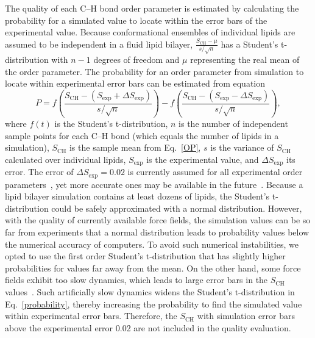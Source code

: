 \documentclass[fleqn,10pt]{wlscirep}
\begin{document}
The quality of each C--H bond order parameter is estimated by calculating the probability for a simulated value to locate within the error bars of the experimental value. Because conformational ensembles of individual lipids are assumed to be independent in a fluid lipid bilayer, $\frac{S_\mathrm{CH}-\mu}{s/\sqrt{n}}$ has a Student's t-distribution with $n-1$ degrees of freedom and $\mu$ representing the real mean of the order parameter. The probability for an order parameter from simulation to locate within experimental error bars can be estimated from equation
\begin{equation}\label{probability}
  P = f \left( \frac{S_\mathrm{CH} - (S_\mathrm{exp}+\Delta S_\mathrm{exp})}{s/\sqrt{n}} \right) - f \left( \frac{S_\mathrm{CH} - (S_\mathrm{exp}-\Delta S_\mathrm{exp})}{s/\sqrt{n}} \right),
\end{equation}
where $f(t)$ is the %
Student's t-distribution, $n$ is the number of independent sample points for each C--H bond (which equals the number of lipids in a simulation), $S_\mathrm{CH}$ is the sample mean from Eq.~\eqref{OP}, $s$ is the variance of $S_\mathrm {CH}$ calculated over individual lipids, $S_\mathrm{exp}$ is the experimental value, and $\Delta S_\mathrm{exp}$ its error. The error of $\Delta S_\mathrm{exp} = 0.02$ is currently assumed for all experimental order parameters~\cite{ollila16}, yet more accurate ones may be available in the future~\cite{wurl22}. Because a lipid bilayer simulation contains at least dozens of lipids, the Student's t-distribution could be safely approximated with a normal distribution. However, with the quality of currently available force fields, the simulation values can be so far from experiments that a normal distribution leads to probability values below the numerical accuracy of computers. To avoid such numerical instabilities, we opted to use the first order Student's t-distribution that has slightly higher probabilities for values far away from the mean. On the other hand, some force fields exhibit too slow dynamics, which leads to large error bars in the $S_\mathrm{CH}$ values~\cite{antila21a}. Such artificially slow dynamics widens the Student's t-distribution in Eq.~\ref{probability}, thereby increasing the probability to find the simulated value within experimental error bars. Therefore, the $S_\mathrm{CH}$ with simulation error bars above the experimental error 0.02 are not included in the quality evaluation.
\end{document}
